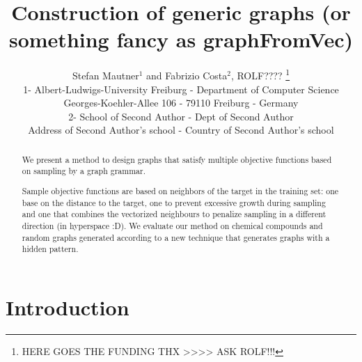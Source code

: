 \documentclass{esannV2} \usepackage[dvips]{graphicx}
\begin{document}
 \title{Construction of generic graphs (or something fancy as graphFromVec)}
\author{Stefan Mautner$^1$ and Fabrizio Costa$^2$, ROLF????
%
\thanks{HERE GOES THE FUNDING THX >>>> ASK ROLF!!!}
%
\vspace{.3cm}\\
%
1- Albert-Ludwigs-University Freiburg  - Department of Computer Science \\
Georges-Koehler-Allee 106  - 79110 Freiburg - Germany
\vspace{.1cm}\\ 2- School of Second Author - Dept of Second Author \\ Address
of Second Author's school - Country of Second Author's school\\ } \maketitle





\begin{abstract}

 We present a method to design graphs that satisfy multiple
    objective functions based on sampling by a graph grammar.

Sample objective functions are based on neighbors of the target in the training
    set: one base on the distance to the target, one to prevent excessive
    growth during sampling and one that combines the vectorized neighbours to
    penalize sampling in a different direction (in hyperspace :D).  We evaluate
    our method on chemical compounds and random graphs generated according to a
    new technique that generates graphs with a hidden pattern.

\end{abstract}

\section{Introduction}
\end{document}
